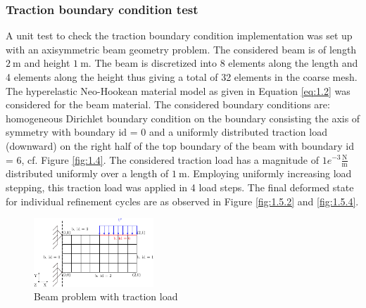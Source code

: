 \documentclass[11pt,a4paper,final]{article}
\begin{document}
\subsubsection{Traction boundary condition test}
A unit test to check the traction boundary condition implementation was set up with an axisymmetric beam geometry problem. The considered beam is of length $2 \ \text{m}$ and height $1 \ \text{m}$. The beam is discretized into 8 elements along the length and 4 elements along the height thus giving a total of 32 elements in the coarse mesh. The hyperelastic Neo-Hookean material model as given in Equation \eqref{eq:1.2} was considered for the beam material. The considered boundary conditions are: homogeneous Dirichlet boundary condition on the boundary consisting the axis of symmetry with boundary id = 0 and a uniformly distributed traction load (downward) on the right half of the top boundary of the beam with boundary id = 6, cf. Figure \eqref{fig:1.4}. The considered traction load has a magnitude of $1e^{-3} \frac{\text{N}}{\text{m}}$ distributed uniformly over a length of $1 \ \text{m}$. Employing uniformly increasing load stepping, this traction load was applied in 4 load steps.  The final deformed state for individual refinement cycles are as observed in Figure \eqref{fig:1.5.2} and \eqref{fig:1.5.4}.

\begin{figure}[h]
\centering 
\includegraphics[width=0.4\textwidth]{beam_grid.pdf}
\caption{Beam problem with traction load}
\label{fig:1.4}
\end{figure} 
\end{document}
